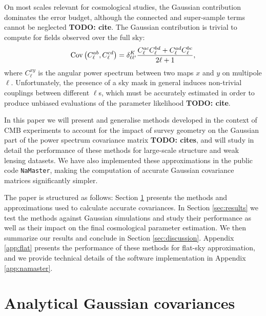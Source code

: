 \documentclass[a4paper,11pt]{article}
\newcommand{\todo}[1]{{\bf TODO: #1}}
\begin{document}
    On most scales relevant for cosmological studies, the Gaussian contribution dominates the error budget, although the connected and super-sample terms cannot be neglected \todo{cite}. The Gaussian contribution is trivial to compute for fields observed over the full sky:
    \begin{equation}\label{eq:cov_naive}
      {\rm Cov}\left(C^{ab}_\ell,C^{cd}_\ell\right)=\delta^K_{\ell\ell'}\frac{C^{ac}_\ell C^{bd}_\ell+C^{ad}_\ell C^{bc}_\ell}{2\ell+1},
    \end{equation}
    where $C^{xy}_\ell$ is the angular power spectrum between two maps $x$ and $y$ on multipole $\ell$. Unfortunately, the presence of a sky mask in general induces non-trivial couplings between different $\ell$s, which must be accurately estimated in order to produce unbiased evaluations of the parameter likelihood \todo{cite}.
  
    In this paper we will present and generalise methods developed in the context of CMB experiments to account for the impact of survey geometry on the Gaussian part of the power spectrum covariance matrix \todo{cites}, and will study in detail the performance of these methods for large-scale structure and weak lensing datasets. We have also implemented these approximations in the public code {\tt NaMaster}, making the computation of accurate Gaussian covariance matrices significantly simpler.

    The paper is structured as follows: Section \ref{sec:theory} presents the methods and approximations used to calculate accurate covariances. In Section \ref{sec:results} we test the methods against Gaussian simulations and study their performance as well as their impact on the final cosmological parameter estimation. We then summarize our results and conclude in Section \ref{sec:discussion}. Appendix \ref{app:flat} presents the performance of these methods for flat-sky approximation, and we provide technical details of the software implementation in Appendix \ref{app:namaster}.

  \section{Analytical Gaussian covariances}\label{sec:theory}
\end{document}
